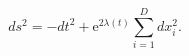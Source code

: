 \begin{equation}
ds^2
   = - dt^2
     + \mathrm{e}^{2\lambda(t)}\sum^{D}_{i=1}dx^2_i.
\end{equation}

